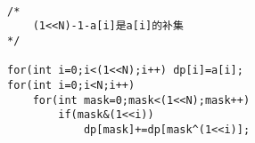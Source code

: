 \begin{lstlisting}

/*
    (1<<N)-1-a[i]是a[i]的补集
*/

for(int i=0;i<(1<<N);i++) dp[i]=a[i];
for(int i=0;i<N;i++)
    for(int mask=0;mask<(1<<N);mask++)
        if(mask&(1<<i))
            dp[mask]+=dp[mask^(1<<i)];
\end{lstlisting}